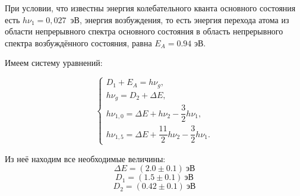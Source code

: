 При условии, что известны энергия колебательного кванта основного
состояния есть $h\nu_1=0,027$~эВ, энергия возбуждения, то есть энергия
перехода атома из области непрерывного спектра основного состояния в
область непрерывного спектра возбуждённого состояния, равна $E_A=0.94$
эВ.\\

\newpage

Имеем систему уравнений:

\begin{equation*}
  \begin{cases}
    D_1+E_A=h \nu_g,                               \\
    h\nu_g=D_2+\Delta E,                           \\
    h\nu_{1,0} =\Delta E+h\nu_2-\dfrac{3}{2}h\nu_1, \\
    h\nu_{1,5}=\Delta E+\dfrac{11}{2}h\nu_2-\dfrac{3}{2}h\nu_1.
  \end{cases}
\end{equation*}

Из неё находим все необходимые величины:
\[ \Delta E=(2.0\pm 0.1) \ \text{эВ} \]
\[  D_1=(1.5\pm 0.1)\  \text{эВ}  \]
\[ D_2=(0.42\pm 0.1) \ \text{эВ} \]